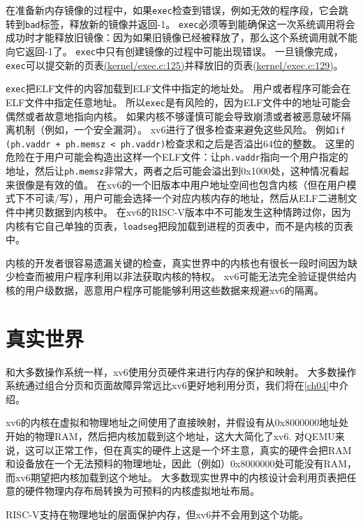 在准备新内存镜像的过程中，如果\texttt{exec}检查到错误，例如无效的程序段，它会跳转到\texttt{bad}标签，释放新的镜像并返回-1。
\texttt{exec}必须等到能确保这一次系统调用将会成功时才能释放旧镜像：因为如果旧镜像已经被释放了，那么这个系统调用就不能向它返回-1了。
\texttt{exec}中只有创建镜像的过程中可能出现错误。
一旦镜像完成，\texttt{exec}可以提交新的页表\href{https://github.com/mit-pdos/xv6-riscv/blob/riscv//kernel/exec.c#L125}{(kernel/exec.c:125)}并释放旧的页表\href{https://github.com/mit-pdos/xv6-riscv/blob/riscv//kernel/exec.c#L129}{(kernel/exec.c:129)}。

\texttt{exec}把ELF文件的内容加载到ELF文件中指定的地址处。
用户或者程序可能会在ELF文件中指定任意地址。
所以\texttt{exec}是有风险的，因为ELF文件中的地址可能会偶然或者故意地指向内核。
如果内核不够谨慎可能会导致崩溃或者被恶意破坏隔离机制（例如，一个安全漏洞）。
xv6进行了很多检查来避免这些风险。
例如\texttt{if (ph.vaddr + ph.memsz < ph.vaddr)}检查求和之后是否溢出64位的整数。
这里的危险在于用户可能会构造出这样一个ELF文件：让\texttt{ph.vaddr}指向一个用户指定的地址，然后让\texttt{ph.memsz}非常大，两者之后可能会溢出到0x1000处，这种情况看起来很像是有效的值。
在xv6的一个旧版本中用户地址空间也包含内核（但在用户模式下不可读/写），用户可能会选择一个对应内核内存的地址，然后从ELF二进制文件中拷贝数据到内核中。
在xv6的RISC-V版本中不可能发生这种情跨过你，因为内核有它自己单独的页表，\texttt{loadseg}把段加载到进程的页表中，而不是内核的页表中。

内核的开发者很容易遗漏关键的检查，真实世界中的内核也有很长一段时间因为缺少检查而被用户程序利用以非法获取内核的特权。
xv6可能无法完全验证提供给内核的用户级数据，恶意用户程序可能能够利用这些数据来规避xv6的隔离。

\section{真实世界}
和大多数操作系统一样，xv6使用分页硬件来进行内存的保护和映射。
大多数操作系统通过组合分页和页面故障异常远比xv6更好地利用分页，我们将在\autoref{ch04}中介绍。

xv6的内核在虚拟和物理地址之间使用了直接映射，并假设有从0x8000000地址处开始的物理RAM，然后把内核加载到这个地址，这大大简化了xv6.
对QEMU来说，这可以正常工作，但在真实的硬件上这是一个坏主意，真实的硬件会把RAM和设备放在一个无法预料的物理地址，因此（例如）0x8000000处可能没有RAM，而xv6期望把内核加载到这个地址。
大多数现实世界中的内核设计会利用页表把任意的硬件物理内存布局转换为可预料的内核虚拟地址布局。

RISC-V支持在物理地址的层面保护内存，但xv6并不会用到这个功能。

